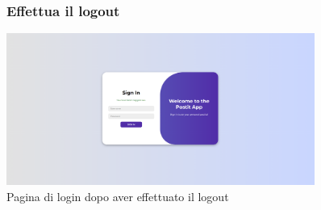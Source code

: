 \begin{center}
    \begin{figure}[th]
        \centering
        \subsubsection{Effettua il logout}
        \includegraphics[width=0.9\textwidth]{images/7 logout.png}
        \caption{Pagina di login dopo aver effettuato il logout}
        \label{fig:enter-label}
    \end{figure}
\end{center}
\vspace*{\fill}
